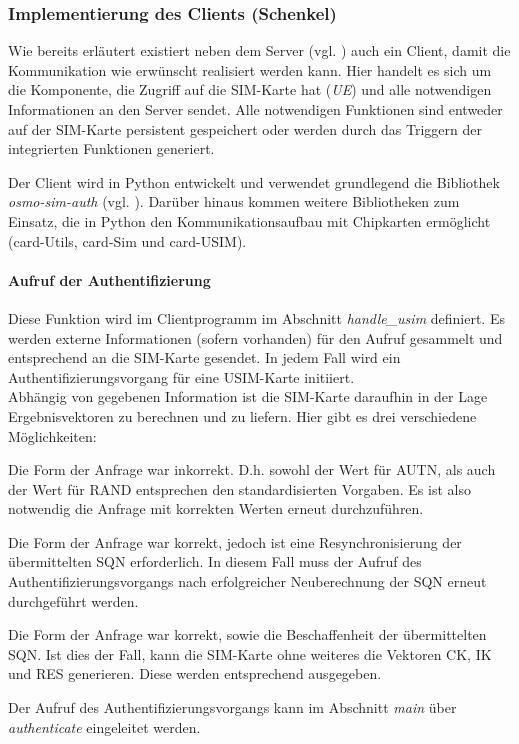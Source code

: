     \subsubsection{Implementierung des Clients (Schenkel)}
    Wie bereits erläutert existiert neben dem Server (vgl. ) auch ein Client,
    damit die Kommunikation wie erwünscht realisiert werden kann. Hier handelt es sich um die Komponente,
    die Zugriff auf die SIM-Karte hat (\emph{UE}) und alle notwendigen Informationen an den Server sendet.
    Alle notwendigen Funktionen sind entweder auf der SIM-Karte persistent gespeichert oder werden durch
    das Triggern der integrierten Funktionen generiert.

    Der Client wird in Python entwickelt und verwendet grundlegend die Bibliothek \textit{osmo-sim-auth}
    (vgl. ). Darüber hinaus kommen weitere  Bibliotheken zum Einsatz, die in
    Python den Kommunikationsaufbau mit Chipkarten ermöglicht (card-Utils, card-Sim und card-USIM).

        \paragraph{Aufruf der Authentifizierung} Diese Funktion wird im Clientprogramm im Abschnitt
        \textit{handle\_usim} definiert. Es werden externe Informationen (sofern vorhanden) für den Aufruf
        gesammelt und entsprechend an die SIM-Karte gesendet. In jedem Fall wird ein Authentifizierungsvorgang
        für eine USIM-Karte initiiert. \\
        Abhängig von gegebenen Information ist die SIM-Karte daraufhin in der Lage Ergebnisvektoren
        zu berechnen und zu liefern. Hier gibt es drei verschiedene Möglichkeiten:
            \begin{addmargin}[1em]{2em}
            Die Form der Anfrage war inkorrekt. D.h. sowohl der Wert für AUTN, als auch der Wert für RAND entsprechen
            den standardisierten Vorgaben. Es ist also notwendig die Anfrage mit korrekten Werten erneut
            durchzuführen.

            Die Form der Anfrage war korrekt, jedoch ist eine Resynchronisierung der übermittelten SQN erforderlich.
            In diesem Fall muss der Aufruf des Authentifizierungsvorgangs nach erfolgreicher Neuberechnung der SQN
            erneut durchgeführt werden.

            Die Form der Anfrage war korrekt, sowie die Beschaffenheit der übermittelten SQN. Ist dies der Fall,
            kann die SIM-Karte ohne weiteres die Vektoren CK, IK und RES generieren. Diese werden entsprechend
            ausgegeben.
            \end{addmargin}
        Der Aufruf des Authentifizierungsvorgangs kann im Abschnitt \textit{main} über \textit{authenticate}
        eingeleitet werden.

